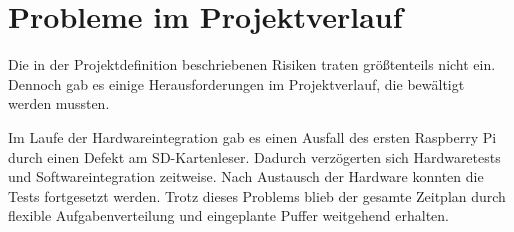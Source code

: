 \chapter{Probleme im Projektverlauf}

Die in der Projektdefinition beschriebenen Risiken traten größtenteils nicht ein. Dennoch gab es einige Herausforderungen im Projektverlauf, die bewältigt werden mussten.

Im Laufe der Hardwareintegration gab es einen Ausfall des ersten Raspberry Pi durch einen Defekt am SD-Kartenleser. Dadurch verzögerten sich Hardwaretests und Softwareintegration zeitweise. Nach Austausch der Hardware konnten die Tests fortgesetzt werden. Trotz dieses Problems blieb der gesamte Zeitplan durch flexible Aufgabenverteilung und eingeplante Puffer weitgehend erhalten.

